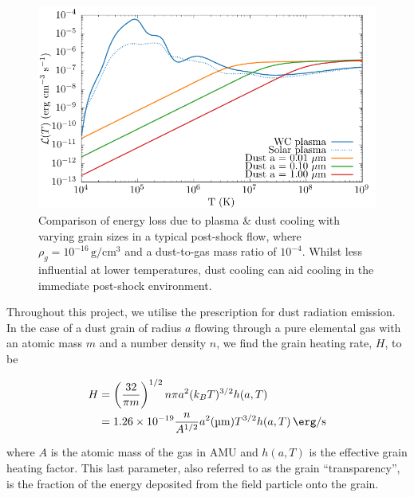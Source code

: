 \begin{figure}[h]
  \centering
  \includegraphics{assets/dust-plasma-cooling-comparison/cooling-comparison-forpaper2.pdf}
  \caption[Comparison of dust and plasma cooling rates in post-shock environment]{Comparison of energy loss due to plasma \& dust cooling with varying grain sizes in a typical post-shock flow, where $\rho_g = 10^{-16} \, \si{\gram\per\centi\metre\cubed}$ and a dust-to-gas mass ratio of $10^{-4}$. Whilst less influential at lower temperatures, dust cooling can aid cooling in the immediate post-shock environment.}
  \label{fig:postshockcoolcomparison-chapter3}
\end{figure}


Throughout this project, we utilise the \textcite{dwek_infrared_1981} prescription for dust radiation emission.
In the case of a dust grain of radius $a$ flowing through a pure elemental gas with an atomic mass $m$ and a number density $n$, we find the grain heating rate, $H$, to be 

\begin{equation}
  \begin{split}
    H & = \left(\frac{32}{\pi m}\right)^{1/2} n\pi a^2 (k_B T)^{3/2} h(a,T) \\
    & = \num{1.26e-19} \frac{n}{A^{1/2}} a^2 (\si{\micro\metre}) T^{3/2} h(a,T) \, \si{\erg\per\second}
  \end{split}
\end{equation}

\noindent
where $A$ is the atomic mass of the gas in AMU and $h(a,T)$ is the effective grain heating factor.
This last parameter, also referred to as the grain ``transparency'', is the fraction of the energy deposited from the field particle onto the grain.

